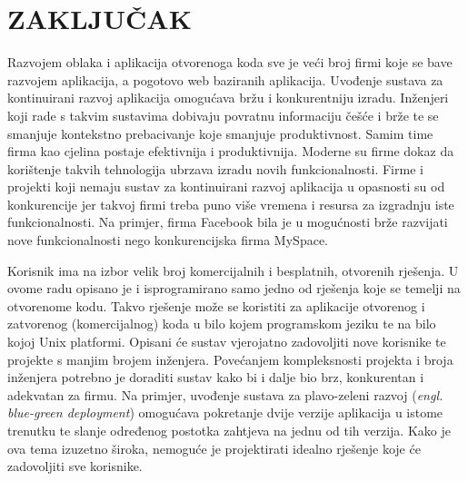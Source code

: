 \chapter{ZAKLJUČAK}
Razvojem oblaka i aplikacija otvorenoga koda sve je veći broj firmi koje se bave razvojem
aplikacija, a pogotovo web baziranih aplikacija. Uvođenje sustava za kontinuirani razvoj aplikacija
omogućava bržu i konkurentniju izradu. Inženjeri koji rade s takvim sustavima dobivaju povratnu
informaciju češće i brže te se smanjuje kontekstno prebacivanje koje smanjuje produktivnost. Samim
time firma kao cjelina postaje efektivnija i produktivnija. Moderne su firme dokaz da korištenje
takvih tehnologija ubrzava izradu novih funkcionalnosti. Firme i projekti koji nemaju sustav za
kontinuirani razvoj aplikacija u opasnosti su od konkurencije jer takvoj firmi treba puno više
vremena i resursa za izgradnju iste funkcionalnosti. Na primjer, firma Facebook bila je u mogućnosti
brže razvijati nove funkcionalnosti nego konkurencijska firma MySpace.

Korisnik ima na izbor velik broj komercijalnih i besplatnih, otvorenih rješenja. U ovome radu
opisano je i isprogramirano samo jedno od rješenja koje se temelji na otvorenome kodu. Takvo
rješenje može se koristiti za aplikacije otvorenog i zatvorenog (komercijalnog) koda u bilo kojem
programskom jeziku te na bilo kojoj Unix platformi. Opisani će sustav vjerojatno zadovoljiti nove
korisnike te projekte s manjim brojem inženjera. Povećanjem kompleksnosti projekta i broja
inženjera potrebno je doraditi sustav kako bi i dalje bio brz, konkurentan i adekvatan za firmu. Na
primjer, uvođenje sustava za plavo-zeleni razvoj (\textit{engl. blue-green deployment}) omogućava
pokretanje dvije verzije aplikacija u istome trenutku te slanje određenog postotka zahtjeva na jednu
od tih verzija.  Kako je ova tema izuzetno široka, nemoguće je projektirati idealno rješenje koje
će zadovoljiti sve
korisnike.


